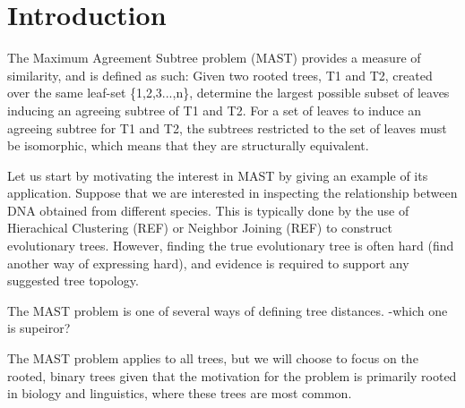 \chapter{Introduction}
\label{ch:intro}
The Maximum Agreement Subtree problem (MAST) provides a  measure of similarity, and is defined as such: Given two rooted trees, T1 and T2, created over the same leaf-set \{1,2,3...,n\}, determine the largest possible subset of leaves inducing an agreeing subtree of T1 and T2. For a set of leaves to induce an agreeing subtree for T1 and T2, the subtrees restricted to the set of leaves must be isomorphic, which means that they are structurally equivalent.

Let us start by motivating the interest in MAST by giving an example of its application. Suppose that we are interested in inspecting the relationship between DNA obtained from different species. This is typically done by the use of  Hierachical Clustering (REF) or Neighbor Joining (REF) to construct evolutionary trees. However, finding the true evolutionary tree is often hard (find another way of expressing hard), and evidence is required to support any suggested tree topology.  




The MAST problem is one of several ways of defining tree distances. -which one is supeiror?



The MAST problem applies to all trees, but we will choose to focus on the rooted, binary trees given that the motivation for the problem is primarily rooted in biology and linguistics, where these trees are most common.  


\todo{\dots}